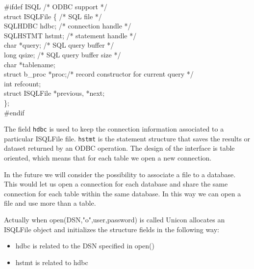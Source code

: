 \begin{iconcode}
\#ifdef ISQL\>\>\>\>\>\>\>\>\>\>             /* ODBC support */ \\
\>  struct ISQLFile \{\>\>\>\>\>\>\>\>\>     /* SQL file     */ \\
\>\>    SQLHDBC hdbc;\>\>\>\>\>\>\>\>        /* connection handle */ \\
\>\>    SQLHSTMT hstmt;\>\>\>\>\>\>\>\>      /* statement handle  */ \\
\>\>    char *query;\>\>\>\>\>\>\>\>         /* SQL query buffer */ \\
\>\>    long qsize;\>\>\>\>\>\>\>\>          /* SQL query buffer size */ \\
\>\>    char *tablename; \\
\>\>    struct b\_proc *proc;\>\>\>\>\>\>\>\>/* record constructor for current query */ \\
\>\>    int refcount; \\
\>\>    struct ISQLFile *previous, *next; \\
\>\>    \}; \\
\#endif
\end{iconcode}

The field \texttt{hdbc} is used to keep the connection information associated
to a particular ISQLFile file. \texttt{hstmt} is the statement structure that
saves the results or dataset returned by an ODBC operation. The design
of the interface is table oriented, which means that for each table we
open a new connection.

In the future we will consider the possibility to associate a file to
a database. This would let us open a connection for each database and
share the same connection for each table within the same database. In
this way we can open a file and use more than a table.

Actually when open(DSN,"o",user,password) is called Unicon allocates
an ISQLFile object and initializes the structure fields in the
following way:

\begin{itemize}
\item    hdbc is related to the DSN specified in open()
\item    hstmt is related to hdbc
\end{itemize}
